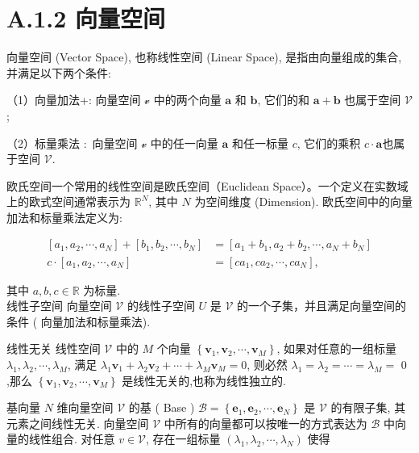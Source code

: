 \documentclass[10pt]{article}
\begin{document}
\section*{A.1.2 向量空间}
向量空间 (Vector Space), 也称线性空间 (Linear Space), 是指由向量组成的集合,并满足以下两个条件:

（1）向量加法+: 向量空间 $\mathcal{v}$ 中的两个向量 $\boldsymbol{a}$ 和 $\boldsymbol{b}$, 它们的和 $\boldsymbol{a}+\boldsymbol{b}$ 也属于空间 $\mathcal{V}$;

（2）标量乘法 $:$ 向量空间 $\mathcal{v}$ 中的任一向量 $\boldsymbol{a}$ 和任一标量 $c$, 它们的乘积 $c \cdot \boldsymbol{a}$也属于空间 $\mathcal{V}$.

欧氏空间一个常用的线性空间是欧氏空间（Euclidean Space）。一个定义在实数域上的欧式空间通常表示为 $\mathbb{R}^{N}$, 其中 $N$ 为空间维度 (Dimension). 欧氏空间中的向量加法和标量乘法定义为:


\begin{align*}
{\left[a_{1}, a_{2}, \cdots, a_{N}\right]+\left[b_{1}, b_{2}, \cdots, b_{N}\right] } & =\left[a_{1}+b_{1}, a_{2}+b_{2}, \cdots, a_{N}+b_{N}\right]  \tag{A.2}\\
c \cdot\left[a_{1}, a_{2}, \cdots, a_{N}\right] & =\left[c a_{1}, c a_{2}, \cdots, c a_{N}\right], \tag{A.3}
\end{align*}


其中 $a, b, c \in \mathbb{R}$ 为标量.\\
线性子空间 向量空间 $\mathcal{V}$ 的线性子空间 $U$ 是 $\mathcal{V}$ 的一个子集，并且满足向量空间的条件 ( 向量加法和标量乘法).

线性无关 线性空间 $\mathcal{V}$ 中的 $M$ 个向量 $\left\{\boldsymbol{v}_{1}, \boldsymbol{v}_{2}, \cdots, \boldsymbol{v}_{M}\right\}$, 如果对任意的一组标量 $\lambda_{1}, \lambda_{2}, \cdots, \lambda_{M}$, 满足 $\lambda_{1} \boldsymbol{v}_{1}+\lambda_{2} \boldsymbol{v}_{2}+\cdots+\lambda_{M} \boldsymbol{v}_{M}=0$, 则必然 $\lambda_{1}=\lambda_{2}=\cdots=\lambda_{M}=$ 0 ,那么 $\left\{\boldsymbol{v}_{1}, \boldsymbol{v}_{2}, \cdots, \boldsymbol{v}_{M}\right\}$ 是线性无关的,也称为线性独立的.

基向量 $N$ 维向量空间 $\mathcal{V}$ 的基 ( Base ) $\mathcal{B}=\left\{\boldsymbol{e}_{1}, \boldsymbol{e}_{2}, \cdots, \boldsymbol{e}_{N}\right\}$ 是 $\mathcal{V}$ 的有限子集, 其元素之间线性无关. 向量空间 $\mathcal{V}$ 中所有的向量都可以按唯一的方式表达为 $\mathcal{B}$ 中向量的线性组合. 对任意 $v \in \mathcal{V}$, 存在一组标量 $\left(\lambda_{1}, \lambda_{2}, \cdots, \lambda_{N}\right)$ 使得
\end{document}
